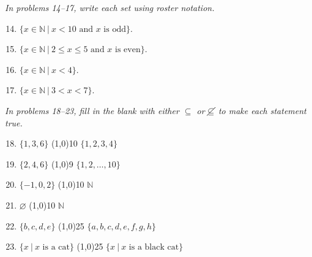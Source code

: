 \emph{In problems 14--17, write each set using roster notation.}
\begin{enumerate}
\setcounter{enumi}{13}

\item $\{x \in \mathbb{N}\ |\ x < 10 \textrm{ and } x \textrm{ is odd}\}$. 

\item $\{x \in \mathbb{N}\ |\ 2 \leq x \leq 5 \textrm{ and } x \textrm{ is even}\}$. 

\item $\{x \in \mathbb{N}\ |\ x < 4\}$. 

\item $\{x \in \mathbb{N}\ |\ 3 < x < 7\}$. 
\end{enumerate}

\emph{In problems 18--23, fill in the blank with either $\subseteq$ or $\cancel{\subseteq}$ to make each statement true.}
\begin{enumerate}
\setcounter{enumi}{17}

\item $\{1,3,6\}$ \line(1,0){10} $\{1,2,3,4\}$ \answer{$\cancel{\subseteq}$}

\item $\{2,4,6\}$ \line(1,0){9} $\{1,2,\ldots,10\}$ \answer{$\subseteq$}

\item $\{-1,0,2\}$ \line(1,0){10} $\mathbb{N}$ \answer{$\cancel{\subseteq}$}

\item $\varnothing$ \line(1,0){10} $\mathbb{N}$ \answer{$\subseteq$}

\item $\{b,c,d,e\}$ \line(1,0){25} $\{a,b,c,d,e,f,g,h\}$ \answer{$\subseteq$}

\item $\{x\ |\ x \textrm{ is a cat}\}$ \line(1,0){25} $\{x\ |\ x \textrm{ is a black cat}\}$ \answer{$\cancel{\subseteq}$}
\end{enumerate}

